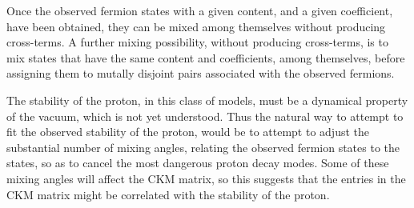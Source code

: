 \documentclass[a4paper,12pt,oneside]{article}
\begin{document}
Once the observed fermion states with a given \coordHE{} content, and a given \coordHE{} coefficient, have been
obtained, they can be mixed among themselves without producing
cross-terms.  A further mixing possibility, without producing
cross-terms, is to mix \coordHE{} states that have the same
\coordHE{} content and \coordHE{} coefficients,
among themselves, before assigning them to mutally disjoint pairs
associated with the observed fermions.

The stability of the proton, in this class of models, must be a
dynamical property of the vacuum, which is not yet understood.  Thus
the natural way to attempt to fit the observed stability of the
proton, would be to attempt to adjust the substantial number of
mixing angles, relating the observed fermion states to the 
\coordHE{} states, so as to cancel the most dangerous proton
decay modes.  Some of these mixing angles will affect the CKM 
matrix, so this suggests that the entries in the CKM matrix might be
correlated with the stability of the proton.

\vspace{0.5cm}
\end{document}
